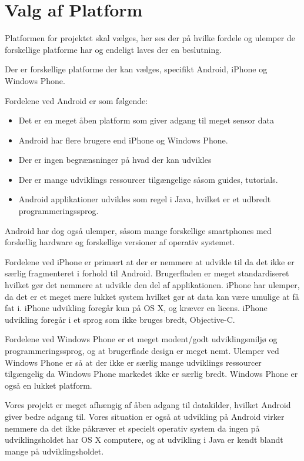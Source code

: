 \section{Valg af Platform}
Platformen for projektet skal vælges, her ses der på hvilke fordele og ulemper de forskellige platforme har og endeligt laves der en beslutning.

Der er forskellige platforme der kan vælges, specifikt Android, iPhone og Windows Phone. 

Fordelene ved Android er som følgende:
\begin{itemize}
\item Det er en meget åben platform som giver adgang til meget sensor data
\item Android har flere brugere end iPhone og Windows Phone.
\item Der er ingen begrænsninger på hvad der kan udvikles
\item Der er mange udviklings ressourcer tilgængelige såsom guides, tutorials.
\item Android applikationer udvikles som regel i Java, hvilket er et udbredt programmeringssprog.
\end{itemize}

Android har dog også ulemper, såsom mange forskellige smartphones med forskellig hardware og forskellige versioner af operativ systemet.

Fordelene ved iPhone er primært at der er nemmere at udvikle til da det ikke er særlig fragmenteret i forhold til Android. 
Brugerfladen er meget standardiseret hvilket gør det nemmere at udvikle den del af applikationen. 
iPhone har ulemper, da det er et meget mere lukket system hvilket gør at data kan være umulige at få fat i. iPhone udvikling foregår kun på OS X, og kræver en licens. iPhone udvikling foregår i et sprog som ikke bruges bredt, Objective-C.

Fordelene ved Windows Phone er et meget modent/godt udviklingsmiljø og programmeringssprog, og at brugerflade design er meget nemt. 
Ulemper ved Windows Phone er så at der ikke er særlig mange udviklings ressourcer tilgængelig da Windows Phone markedet ikke er særlig bredt. Windows Phone er også en lukket platform.

Vores projekt er meget afhængig af åben adgang til datakilder, hvilket Android giver bedre adgang til. Vores situation er også at udvikling på Android virker nemmere da det ikke påkræver et specielt operativ system da ingen på udviklingsholdet har OS X computere, og at udvikling i Java er kendt blandt mange på udviklingsholdet.